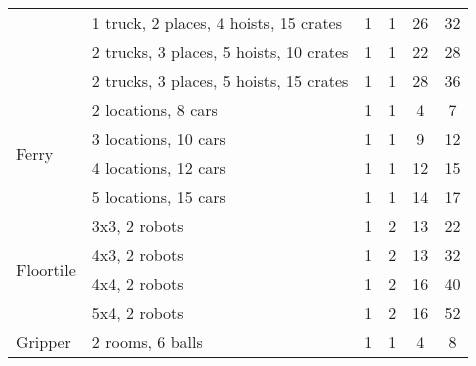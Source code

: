 \documentclass{article}
\begin{document}
\begin{table}[bt!]
{\begin{tabular}{ll|cc|cc}
                                & 1 truck, 2 places, 4 hoists, 15 crates& 1                       & 1                        & 26                       & 32                       \\
                                & 2 trucks, 3 places, 5 hoists, 10 crates& 1                       & 1                        & 22                      & 28                       \\
                                & 2 trucks, 3 places, 5 hoists, 15 crates& 1                       & 1                        & 28                      & 36                       \\ \midrule
\multirow{4}{*}{Ferry}       & 2 locations, 8 cars               & 1                       & 1                        & 4                       & 7                        \\
                                & 3 locations, 10 cars              & 1                       & 1                        & 9                       & 12                       \\
                                & 4 locations, 12 cars              & 1                       & 1                        & 12                      & 15                       \\
                                & 5 locations, 15 cars              & 1                       & 1                        & 14                      & 17                       \\ \midrule
\multirow{4}{*}{Floortile}   & 3x3, 2 robots                     & 1                       & 2                        & 13                      & 22                       \\
                                & 4x3, 2 robots                     & 1                       & 2                        & 13                      & 32                       \\
                                & 4x4, 2 robots                     & 1                       & 2                        & 16                      & 40                       \\
                                & 5x4, 2 robots                     & 1                       & 2                        & 16                      & 52                       \\ \midrule
\multirow{4}{*}{Gripper}        & 2 rooms, 6 balls                  & 1                       & 1                        & 4                       & 8                        \\

\end{tabular}}
\end{table}
\end{document}
